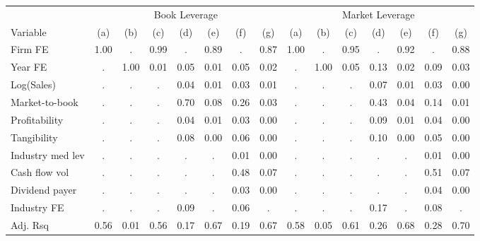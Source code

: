 \begin{tabular}{l c c c c c c c c c c c c c c}
\toprule
& \multicolumn{7}{c}{Book Leverage} & \multicolumn{7}{c}{Market Leverage} \\
\cmidrule(lr){2-8} \cmidrule(lr){9-15}
Variable & (a) & (b) & (c) & (d) & (e) & (f) & (g) & (a) & (b) & (c) & (d) & (e) & (f) & (g) \\
\midrule
Firm FE&1.00&.&0.99&.&0.89&.&0.87&1.00&.&0.95&.&0.92&.&0.88\\
Year FE&.&1.00&0.01&0.05&0.01&0.05&0.02&.&1.00&0.05&0.13&0.02&0.09&0.03\\
Log(Sales)&.&.&.&0.04&0.01&0.03&0.01&.&.&.&0.07&0.01&0.03&0.00\\
Market-to-book&.&.&.&0.70&0.08&0.26&0.03&.&.&.&0.43&0.04&0.14&0.01\\
Profitability&.&.&.&0.04&0.01&0.03&0.00&.&.&.&0.09&0.01&0.04&0.00\\
Tangibility&.&.&.&0.08&0.00&0.06&0.00&.&.&.&0.10&0.00&0.05&0.00\\
Industry med lev&.&.&.&.&.&0.01&0.00&.&.&.&.&.&0.01&0.00\\
Cash flow vol&.&.&.&.&.&0.48&0.07&.&.&.&.&.&0.51&0.07\\
Dividend payer&.&.&.&.&.&0.03&0.00&.&.&.&.&.&0.04&0.00\\
Industry FE&.&.&.&0.09&.&0.06&.&.&.&.&0.17&.&0.08&.\\
Adj. Rsq&0.56&0.01&0.56&0.17&0.67&0.19&0.67&0.58&0.05&0.61&0.26&0.68&0.28&0.70\\
\bottomrule
\end{tabular}
